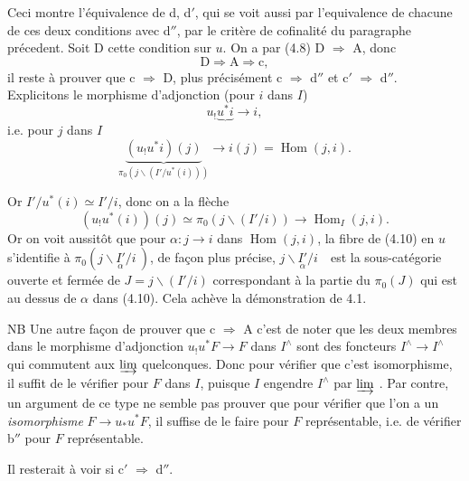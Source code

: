 \documentclass[11pt]{article}
\newcommand{\printedpage}[1]{\marginpar{\footnotesize p.~#1}}
\newcommand{\msp}[1]{\marginpar{\footnotesize [#1]}}
\newcommand{\Hom}{\operatorname{Hom}}
\begin{document}
\printedpage{34}
Ceci montre l'équivalence de d, d$'$, qui se voit aussi par l'equivalence de chacune de ces deux conditions avec d$''$, par le critère de cofinalité du paragraphe précedent. Soit D cette condition sur $u$. On a par (4.8) D $\Longrightarrow$ A, donc %
\[
\mathrm{D} \Longrightarrow \mathrm{A} \Longrightarrow \mathrm{c},
\]
il reste à prouver que c $\Longrightarrow$ D, plus précisément c $\Longrightarrow$ d$''$ et c$'$ $\Longrightarrow$ d$''$. Explicitons le morphisme d'adjonction (pour $i$ dans $I$)
\[
u_!\underbrace{u^*i} \longrightarrow i,
\]
i.e. pour $j$ dans $I$
\[
\underbrace{(u_!u^*i)(j)}_{\pi_0(j\backslash(I'/u^*(i)))} \longrightarrow i(j) = \Hom(j,i).
\]

\msp{page 54}Or $I'/u^*(i) \simeq I'/i$, donc on a la flèche
\[
(u_!u^*(i))(j) \simeq \pi_0(j\backslash(I'/i)) \longrightarrow \Hom_I(j,i). \tag*{(4.10)}
\]
Or on voit aussitôt que pour $\alpha : j \longrightarrow i$ dans $\Hom(j,i)$, la fibre de (4.10) en $u$ s'identifie à $\pi_0(j\backslash\underset{\alpha}{I'}/i\ )$, de façon plus précise, $j\backslash\underset{\alpha}{I'}/i$\ \ est la sous-catégorie ouverte et fermée de $J = j\backslash(I'/i)$ correspondant à la partie du $\pi_0(J)$ qui est au dessus de $\alpha$ dans (4.10). Cela achève la démonstration de 4.1.

NB Une autre façon de prouver que c $\Longrightarrow$ A c'est de noter que les deux membres dans le morphisme d'adjonction $u_!u^*F \longrightarrow F$ dans $I^{\wedge}$ sont des foncteurs $I^{\wedge} \longrightarrow I^{\wedge}$ qui commutent aux $\varinjlim$ quelconques. Donc pour vérifier que c'est isomorphisme, il suffit de le vérifier pour $F$ dans $I$, puisque $I$ engendre $I^{\wedge}$ par $\varinjlim$ . Par contre, un argument de ce type ne semble pas prouver que pour vérifier que l'on a un \textit{isomorphisme} $F \longrightarrow u_*u^*F$, il suffise de le faire pour $F$ représentable, i.e. de vérifier b$''$ pour $F$ représentable.

Il resterait à voir si c$'$ $\Longrightarrow$ d$''$.
\end{document}
